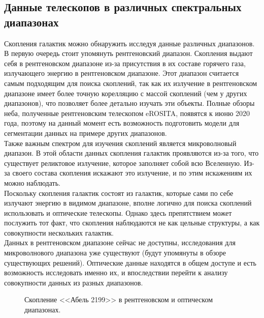 \subsection{Данные телескопов в различных спектральных диапазонах}

Скопления галактик можно обнаружить исследуя данные различных диапазонов.\\

В первую очередь стоит упомянуть рентгеновский диапазон. Скопления выдают себя в рентгеновском 
диапазоне из-за присутствия в их составе горячего газа, излучающего энергию в рентгеновском 
диапазоне. Этот диапазон считается самым подходящим для поиска скоплений, так как их излучение 
в рентгеновском диапазоне имеет более точную корелляцию с массой скоплений (чем у других диапазонов), 
что позволяет более детально изучать эти объекты. Полные обзоры неба, полученные рентгеновским 
телескопом eROSITA, появятся к июню 2020 года, поэтому на данный момент есть возможность 
подготовить модели для сегментации данных на примере других диапазонов.\\

Также важным спектром для изучения скоплений является микроволновый диапазон. В этой области данных 
скопления галактик проявляются из-за того, что существует реликтовое излучение, которое заполняет 
собой всю Вселенную. Из-за своего состава скопления искажают это излучение, и по этим искажениям 
их можно наблюдать.\\ 

Поскольку скопления галактик состоят из галактик, которые сами по себе излучают энергию в видимом 
диапазоне, вполне логично для поиска скоплений использовать и оптические телескопы. Однако здесь 
препятствием может послужить тот факт, что скопления наблюдаются не как цельные структуры, а как 
совокупности нескольких галактик. \\

Данных в рентгеновском диапазоне сейчас не доступны, исследования для микроволнового диапазона уже 
существуют (будут упомянуты в обзоре существующих решений). Оптические данные находятся в общем 
доступе и есть возможность исследовать именно их, и впоследствии перейти к анализу совокупности 
данных из разных диапазонов.\\

\begin{figure}[h]
    \caption{Скопление <<Абель 2199>> в рентгеновском и оптическом диапазонах. \cite{Abell}}
\end{figure}


